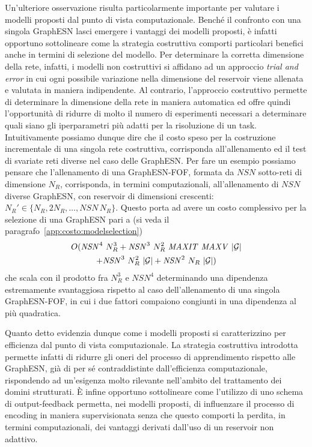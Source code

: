 Un'ulteriore osservazione risulta particolarmente importante per valutare i modelli proposti dal punto di vista computazionale. Benché il confronto con una singola GraphESN lasci emergere i vantaggi dei modelli proposti, è infatti opportuno sottolineare come la strategia costruttiva comporti particolari benefici anche in termini di selezione del modello. Per determinare la corretta dimensione della rete, infatti, i modelli non costruttivi si affidano ad un approccio \emph{trial and error} in cui ogni possibile variazione nella dimensione del reservoir viene allenata e valutata in maniera indipendente. Al contrario, l'approccio costruttivo permette di determinare la dimensione della rete in maniera automatica ed offre quindi l'opportunità di ridurre di molto il numero di esperimenti necessari a determinare quali siano gli iperparametri più adatti per la risoluzione di un task. \\
Intuitivamente possiamo dunque dire che il costo speso per la costruzione incrementale di una singola rete costruttiva, corrisponda all'allenamento ed il test di svariate reti diverse nel caso delle GraphESN. Per fare un esempio possiamo pensare che l'allenamento di una GraphESN-FOF, formata da $\mathit{NSN}$ sotto-reti di dimensione $N_R$, corrisponda, in termini computazionali, all'allenamento di $\mathit{NSN}$ diverse GraphESN, con reservoir di dimensioni crescenti: $N_R' \in \lbrace N_R, 2 N_R, \dots, \mathit{NSN}\, N_R \rbrace$.
Questo porta ad avere un costo complessivo per la selezione di una GraphESN pari a (si veda il paragrafo~\ref{app:costo:modelselection})
\begin{multline}
O(\mathit{NSN}^4\ N_R^3 + \mathit{NSN}^3\ N_R^2\ \mathit{MAXIT}\ \mathit{MAXV}\ \abs{\mathcal{G}} \\
+ \mathit{NSN}^3\ N_R^2\ \abs{\mathcal{G}} + \mathit{NSN}^2\ N_R\ \abs{\mathcal{G}}) 
\end{multline}
che scala con il prodotto fra $N_R^3$ e $\mathit{NSN}^4$ determinando una dipendenza estremamente svantaggiosa rispetto al caso dell'allenamento di una singola GraphESN-FOF, in cui i due fattori compaiono congiunti in una dipendenza al più quadratica.

Quanto detto evidenzia dunque come i modelli proposti si caratterizzino per efficienza dal punto di vista computazionale. La strategia costruttiva introdotta permette infatti di ridurre gli oneri del processo di apprendimento rispetto alle GraphESN, già di per sé contraddistinte dall'efficienza computazionale, rispondendo ad un'esigenza molto rilevante nell'ambito del trattamento dei domini strutturati. 
\`E infine opportuno sottolineare come l'utilizzo di uno schema di output-feedback permetta, nei modelli proposti, di influenzare il processo di encoding in maniera supervisionata senza che questo comporti la perdita, in termini computazionali, dei vantaggi derivati dall'uso di un reservoir non adattivo.



